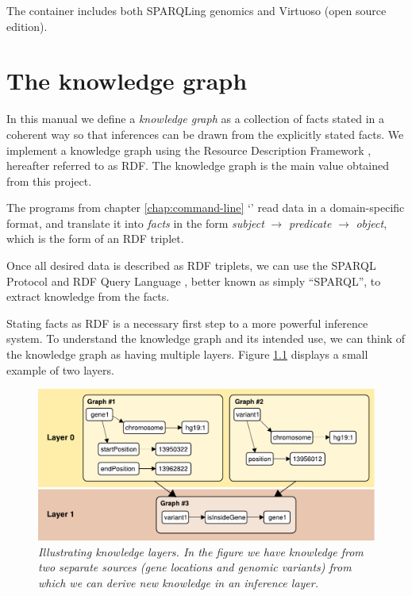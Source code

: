   The container includes both SPARQLing genomics and Virtuoso (open source
  edition).

\chapter{The knowledge graph}

  In this manual we define a \emph{knowledge graph} as a collection of
  facts stated in a coherent way so that inferences can be drawn from
  the explicitly stated facts.  We implement a knowledge graph using the
  Resource Description Framework \citep{Lassila:99:RDF}, hereafter referred
  to as RDF.  The knowledge graph is the main value obtained from this
  project.

  The programs from chapter \ref{chap:command-line}
  {\color{LinkGray}`'} read data in a
  domain-specific format, and translate it into \emph{facts} in the form
  \emph{subject} $\rightarrow$ \emph{predicate} $\rightarrow$
  \emph{object}, which is the form of an RDF triplet.

  Once all desired data is described as RDF triplets, we can use the SPARQL
  Protocol and RDF Query Language \citep{sparql-11}, better known as simply
  ``SPARQL'', to extract knowledge from the facts.

  Stating facts as RDF is a necessary first step to a more powerful inference
  system.  To understand the knowledge graph and its intended use, we can
  think of the knowledge graph as having multiple layers.  Figure
  \ref{fig:layered-knowledge} displays a small example of two layers.

  \begin{figure}[h]
    \begin{center}
    \includegraphics[width=1.0\textwidth]{figures/layered-knowledge.pdf}
    \end{center}
    \caption{\textit{Illustrating knowledge layers.  In the figure we have
        knowledge from two separate sources (gene locations and genomic
        variants) from which we can derive new knowledge in an inference
        layer.}}
    \label{fig:layered-knowledge}
  \end{figure}

